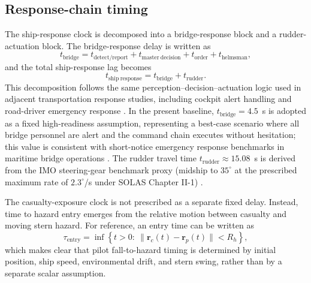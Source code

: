 \documentclass[preprint,12pt]{elsarticle}
\begin{document}
\subsection{Response-chain timing}
The ship-response clock is decomposed into a bridge-response block and a rudder-actuation block. The bridge-response delay is written as
\begin{equation}
t_{\mathrm{bridge}} = t_{\mathrm{detect/report}} + t_{\mathrm{master\ decision}} + t_{\mathrm{order}} + t_{\mathrm{helmsman}},
\end{equation}
and the total ship-response lag becomes
\begin{equation}
t_{\mathrm{ship\ response}} = t_{\mathrm{bridge}} + t_{\mathrm{rudder}}.
\end{equation}
This decomposition follows the same perception--decision--actuation logic used in adjacent transportation response studies, including cockpit alert handling and road-driver emergency response \cite{ref_aviation_alerts,ref_land_detection,ref_land_aeb}. In the present baseline, $t_{\mathrm{bridge}}=4.5$~s is adopted as a fixed high-readiness assumption, representing a best-case scenario where all bridge personnel are alert and the command chain executes without hesitation; this value is consistent with short-notice emergency response benchmarks in maritime bridge operations \cite{ref_solas,ref_iamsar}. The rudder travel time $t_{\mathrm{rudder}}\approx 15.08$~s is derived from the IMO steering-gear benchmark proxy (midship to $35^{\circ}$ at the prescribed maximum rate of $2.3^{\circ}$/s under SOLAS Chapter II-1) \cite{ref_solas}.

The casualty-exposure clock is not prescribed as a separate fixed delay. Instead, time to hazard entry emerges from the relative motion between casualty and moving stern hazard. For reference, an entry time can be written as
\begin{equation}
\tau_{\mathrm{entry}} = \inf\left\{t>0:\ \|\mathbf{r}_c(t)-\mathbf{r}_p(t)\| < R_h\right\},
\end{equation}
which makes clear that pilot fall-to-hazard timing is determined by initial position, ship speed, environmental drift, and stern swing, rather than by a separate scalar assumption.
\end{document}
